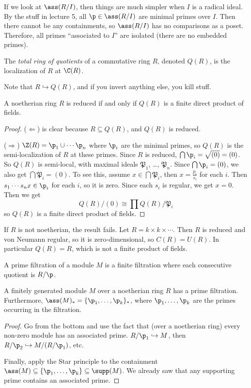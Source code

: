  If we look at $\ass (R/I)$, then things are much simpler when $I$ is a radical ideal. By
 the stuff in lecture 5, all $\p\in \ass(R/I)$ are minimal primes over $I$. Then there
 cannot be any containments, so $\ass(R/I)$ has no comparisons as a poset. Therefore, all
 primes ``associated to $I$'' are isolated (there are no embedded primes).

 \begin{definition}
   The \emph{total ring of quotients} of a commutative ring $R$, denoted $Q(R)$, is the
   localization of $R$ at $\C(R)$.
 \end{definition}
 Note that $R\hookrightarrow Q(R)$, and if you invert anything else, you kill stuff.

 \begin{theorem}
   A noetherian ring $R$ is reduced if and only if $Q(R)$ is a finite direct product of
   fields.
 \end{theorem}
 \begin{proof}\def\P{\mathfrak{P}}
   ($\Leftarrow$) is clear because $R\subseteq Q(R)$, and $Q(R)$ is reduced.

   ($\Rightarrow$) $\Z(R) = \p_1\cup \cdots \p_n$ where $\p_i$ are the minimal primes, so
   $Q(R)$ is the semi-localization of $R$ at these primes. Since $R$ is reduced, $\bigcap
   \p_i=\sqrt{(0)}=(0)$. So $Q(R)$ is semi-local, with maximal ideals $\P_1$, \dots,
   $\P_n$. Since $\bigcap \p_i=(0)$, we also get $\bigcap \P_i=(0)$. To see this, assume
   $x\in \bigcap \P_i$, then $x=\frac{p_i}{s_i}$ for each $i$. Then $s_1\cdots s_n x\in
   \p_i$ for each $i$, so it is zero. Since each $s_i$ is regular, we get $x=0$.
   Then we get
   \[
    Q(R)/(0) \cong \prod Q(R)/\P_i
   \]
   so $Q(R)$ is a finite direct product of fields.
 \end{proof}
 \begin{example}
   If $R$ is not noetherian, the result fails. Let $R=k\times k\times \cdots$. Then $R$
   is reduced and von Neumann regular, so it is zero-dimensional, so $C(R)=U(R)$. In
   particular $Q(R)=R$, which is not a finite product of fields.
 \end{example}

 \begin{definition}
   A prime filtration of a module $M$ is a finite filtration where each consecutive
   quotient is $R/\p$.
 \end{definition}
 \begin{theorem}
   A finitely generated module $M$ over a noetherian ring $R$ has a prime filtration.
   Furthermore, $\ass(M)_* = \{\p_1,\dots, \p_k\}_*$, where $\p_1,\dots, \p_k$ are the
   primes occurring in the filtration.
 \end{theorem}
 \begin{proof}
   Go from the bottom and use the fact that (over a noetherian ring) every non-zero
   module has an associated prime. $R/\p_1\hookrightarrow M$, then $R/\p_2\hookrightarrow
   M/(R/\p_1)$, etc.

   Finally, apply the Star principle to the containment $\ass (M)\subseteq \{\p_1,\dots,
   \p_k\} \subseteq \supp (M)$. We already saw that any supporting prime contains an
   associated prime.
 \end{proof}
 \setcounter{lecture}{12}
